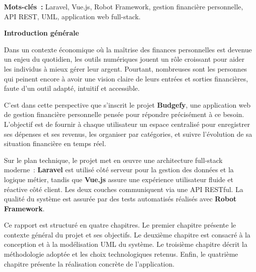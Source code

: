 \documentclass{rapportPFA}
\begin{document}
\textbf{Mots-cl\'es~:} Laravel, Vue.js, Robot Framework, gestion financi\`ere
personnelle, API REST, UML, application web full-stack.

\newpage
\tabledematieres

\newpage
\listoffigures

\newpage
\thispagestyle{empty}
{}
\vspace*{3cm}
\begin{center}
    {\LARGE \textbf{Introduction g\'en\'erale}}
\end{center}
\vspace{2cm}

Dans un contexte \'economique o\`u la ma\^itrise des finances personnelles est devenue
un enjeu du quotidien, les outils num\'eriques jouent un r\^ole croissant pour aider
les individus \`a mieux g\'erer leur argent. Pourtant, nombreuses sont les personnes
qui peinent encore \`a avoir une vision claire de leurs entr\'ees et sorties financi\`eres,
faute d'un outil adapt\'e, intuitif et accessible.

C'est dans cette perspective que s'inscrit le projet \textbf{Budgefy}, une application
web de gestion financi\`ere personnelle pens\'ee pour r\'epondre pr\'ecis\'ement \`a
ce besoin. L'objectif est de fournir \`a chaque utilisateur un espace centralis\'e pour
enregistrer ses d\'epenses et ses revenus, les organiser par cat\'egories, et suivre
l'\'evolution de sa situation financi\`ere en temps r\'eel.

Sur le plan technique, le projet met en \oe uvre une architecture full-stack moderne~:
\textbf{Laravel} est utilis\'e c\^ot\'e serveur pour la gestion des donn\'ees et la
logique m\'etier, tandis que \textbf{Vue.js} assure une exp\'erience utilisateur fluide
et r\'eactive c\^ot\'e client. Les deux couches communiquent via une API RESTful. La
qualit\'e du syst\`eme est assur\'ee par des tests automatis\'es r\'ealis\'es avec
\textbf{Robot Framework}.

Ce rapport est structur\'e en quatre chapitres. Le premier chapitre pr\'esente le
contexte g\'en\'eral du projet et ses objectifs. Le deuxi\`eme chapitre est consacr\'e
\`a la conception et \`a la mod\'elisation UML du syst\`eme. Le troisi\`eme chapitre
d\'ecrit la m\'ethodologie adopt\'ee et les choix technologiques retenus. Enfin, le
quatri\`eme chapitre pr\'esente la r\'ealisation concr\`ete de l'application.
\end{document}
